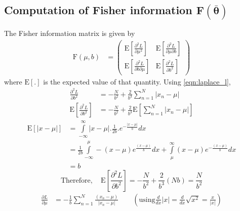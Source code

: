 \documentclass[wcp]{jmlr}
\begin{document}
\subsection*{Computation of Fisher information $\mathbf{F(\bar{\boldsymbol{\theta}})}$}
The Fisher information matrix is given by
\begin{align*}
  \mathrm{F}(\mu,b) &= \left( \begin{array}{cc}
  \mathrm{E} \left[\frac{\partial^2 L}{\partial \mu^2}\right] & \mathrm{E} \left[\frac{\partial^2 L}{\partial\mu \partial b}\right] \\
  \mathrm{E} \left[\frac{\partial^2 L}{\partial b \partial\mu}\right] & \mathrm{E} \left[\frac{\partial^2 L}{\partial b^2}\right] 
  \end{array} \right) 
\end{align*}
where $\mathrm{E}[.]$ is the expected value of that quantity. Using \eqref{eqn:laplace_l},
\begin{align*}
 \frac{\partial^2 L}{\partial b^2} &= -\frac{N}{b^2} + \frac{2}{b^3} \sum_{n=1}^N |x_n-\mu| \\
 \mathrm{E} \left[\frac{\partial^2 L}{\partial b^2}\right] &= -\frac{N}{b^2} + \frac{2}{b^3} \mathrm{E}\left[\sum_{n=1}^N |x_n-\mu|\right]
\end{align*}
\begin{align*}
 \mathrm{E}\left[|x-\mu|\right] &= \int\limits_{-\infty}^{\infty} |x-\mu| . \frac{1}{2b} . e^{-\frac{|x-\mu|}{b}} dx \\
 &= \frac{1}{2b} \int\limits_{-\infty}^{\mu} -(x-\mu) e^{\frac{(x-\mu)}{b}} dx + \int\limits_{\mu}^{\infty} (x-\mu)e^{-\frac{(x-\mu)}{b}} dx \\
 &= b
\end{align*}
\begin{equation}
 \mathrm{Therefore,}\quad \mathrm{E} \left[\frac{\partial^2 L}{\partial b^2}\right] = -\frac{N}{b^2} + \frac{2}{b^3} (Nb) = \frac{N}{b^2} \label{eqn:fisher_44} 
\end{equation}
\begin{align*}
 \frac{\partial L}{\partial \mu} &= -\frac{1}{b} \sum_{n=1}^N \frac{(x_n-\mu)}{|x_n-\mu|} \quad\quad\left(\mathrm{using} \frac{d}{dx}|x| = \frac{d}{dx}\sqrt{x^2} = \frac{x}{|x|}\right)
\end{align*}
\end{document}
